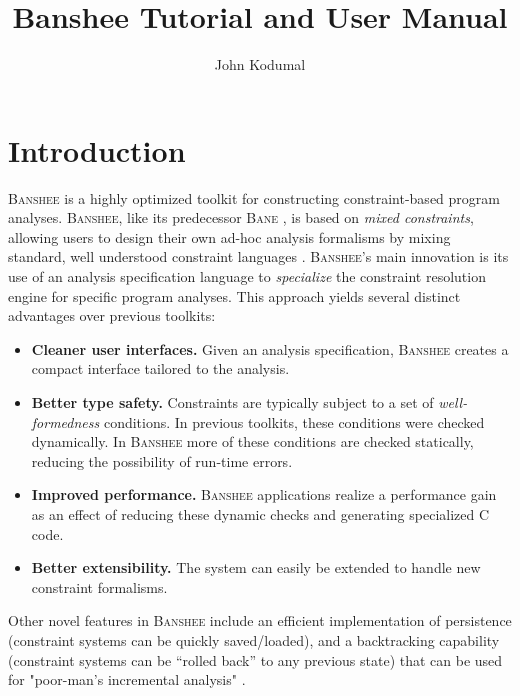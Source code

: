 \documentclass{article}
\title{Banshee Tutorial and User Manual}
\author{John Kodumal}
\newcommand{\bane}{\textsc{Bane}}
\newcommand{\banshee}{\textsc{Banshee}}
\begin{document}
\maketitle

\section{Introduction}

\banshee{} is a highly optimized toolkit for constructing
constraint-based program analyses. \banshee{}, like its predecessor
\bane{} \cite{aiken:tic98}, is based on \emph{mixed constraints},
allowing users to design their own ad-hoc analysis formalisms by
mixing standard, well understood constraint languages
\cite{fahndrich:sas97}. \banshee{}'s main innovation is its use of an
analysis specification language to \emph{specialize} the constraint
resolution engine for specific program analyses. This approach yields
several distinct advantages over previous toolkits:
\begin{itemize}
\item \textbf{Cleaner user interfaces.} Given an analysis
  specification, \banshee{} creates a compact interface tailored to
  the analysis.
\item \textbf{Better type safety.} Constraints are typically subject
  to a set of \emph{well-formedness} conditions. In previous toolkits,
  these conditions were checked dynamically. In \banshee{} more of
  these conditions are checked statically, reducing the possibility of
  run-time errors.
\item \textbf{Improved performance.} \banshee{} applications realize a
  performance gain as an effect of reducing these dynamic checks and
  generating specialized C code.
\item \textbf{Better extensibility.} The system can easily be extended
  to handle new constraint formalisms.
\end{itemize}

Other novel features in \banshee{} include an efficient implementation
of persistence (constraint systems can be quickly saved/loaded), and a
backtracking capability (constraint systems can be ``rolled back'' to
any previous state) that can be used for "poor-man's incremental
analysis" \cite{kodumal:sas05}.
\end{document}
